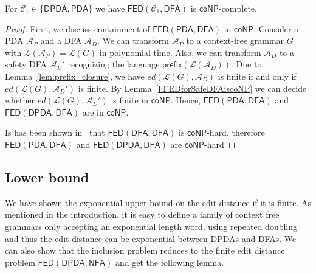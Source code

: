 \documentclass{CSML}
\newcommand{\aut}{\mathcal{A}}
\newcommand{\coNP}{\textsf{coNP}}
\newcommand{\class}{\mathcal{C}}
\newcommand{\DFA}{\mathsf{DFA}}
\newcommand{\NFA}{\mathsf{NFA}}
\newcommand{\PDA}{\mathsf{PDA}}
\newcommand{\DPDA}{\mathsf{DPDA}}
\newcommand{\FED}{\mathsf{FED}}
\newcommand{\lang}{\mathcal{L}}
\newcommand{\prefix}[1]{\textsf{prefix}(#1)}
\newcommand{\ed}{ed}
\begin{document}
\begin{thm}
For $\class_1 \in \{\DPDA,\PDA\}$ we have $\FED(\class_1, \DFA)$ is $\coNP$-complete.
\label{th:FEDonDFAcoNP}
\end{thm}
\begin{proof}
First, we discuss containment of $\FED(\PDA, \DFA)$ in $\coNP$.
Consider a PDA $\aut_P$ and a DFA $\aut_D$. We can transform $\aut_P$
to a context-free grammar $G$ with $\lang(\aut_P) = \lang(G)$ in polynomial time. 
Also, we can transform $\aut_D$ to a safety DFA $\aut_D'$ recognizing
the language $\prefix{\lang({\aut_D})}$.  
Due to Lemma~\ref{lem:prefix_closure}, we have 
$\ed(\lang(G),\aut_D)$ is finite if and only if $\ed(\lang(G),\aut_D')$ is finite. 
By Lemma~\ref{l:FEDforSafeDFAiscoNP} we can decide whether $\ed(\lang(G),\aut_D')$ is finite
in $\coNP$. Hence, $\FED(\PDA, \DFA)$ and $\FED(\DPDA, \DFA)$ are in $\coNP$.

Is has been shown in~\cite{boundedRiveros} that $\FED(\DFA, \DFA)$ is $\coNP$-hard, therefore
$\FED(\PDA, \DFA)$ and $\FED(\DPDA, \DFA)$ are $\coNP$-hard
\end{proof}








\subsection{Lower bound}
\label{sec:FEDLowerBound}

We have shown the exponential upper bound on the edit distance if it is finite.
As mentioned in the introduction, it is easy to define a family of context free grammars only accepting an exponential length word, using repeated doubling and thus the edit distance can be exponential between DPDAs and DFAs.
We can also show that the inclusion problem reduces to the finite edit distance problem $\FED(\DPDA,\NFA)$ and get the following lemma. 
\end{document}
